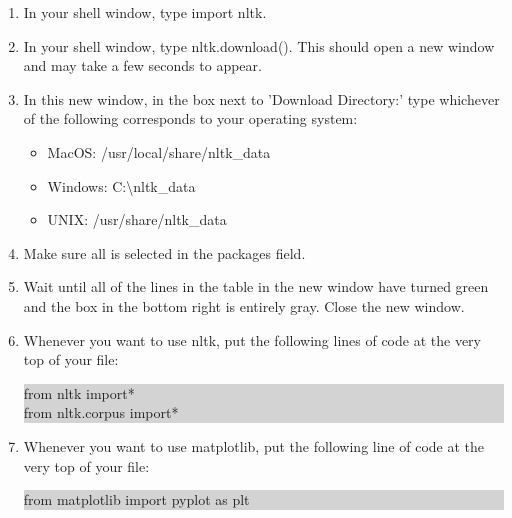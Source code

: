 \documentclass[11pt, letterpaper, onecolumn, oneside, final]{article}
\begin{document}
\begin{enumerate}
\item In your shell window, type {\consolas import nltk}.
\item In your shell window, type {\consolas nltk.download()}. This should open a new window and may take a few seconds to appear.
\item In this new window, in the box next to {\consolas 'Download Directory:'} type whichever of the following corresponds to your operating system:
\begin{itemize}
    \item MacOS: {\consolas /usr/local/share/nltk\_data}
    \item Windows: {\consolas C:\textbackslash nltk\_data}
    \item UNIX: {\consolas /usr/share/nltk\_data}
\end{itemize}
\item Make sure {\consolas all} is selected in the packages field.
\item Wait until all of the lines in the table in the new window have turned green and the box in the bottom right is entirely gray. Close the new window. 
\item Whenever you want to use {\consolas nltk}, put the following lines of code at the very top of your file:
\begin{center}
\colorbox{lightgray}{\parbox{.32\textwidth}{\consolas from nltk import*\\
from nltk.corpus import*}}
\end{center}
\newpage
\item 
Whenever you want to use {\consolas matplotlib}, put the following line of code at the very top of your file:
\begin{center}
\colorbox{lightgray}{\parbox{.45\textwidth}{\consolas from matplotlib import pyplot as plt}}
\end{center}
\end{enumerate}
\end{document}
